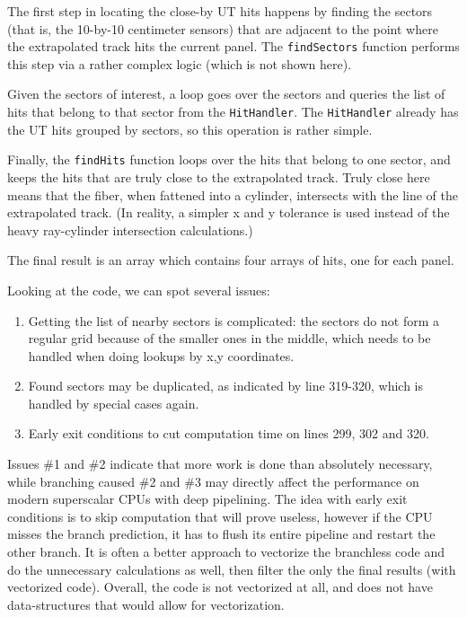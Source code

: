 \documentclass[12pt]{article}
\newcommand{\code}[1]{\texttt{#1}}
\begin{document}
The first step in locating the close-by UT hits happens by finding the sectors (that is, the 10-by-10 centimeter sensors) that are adjacent to the point where the extrapolated track hits the current panel. The \code{findSectors} function performs this step via a rather complex logic (which is not shown here).

Given the sectors of interest, a loop goes over the sectors and queries the list of hits that belong to that sector from the \code{HitHandler}. The \code{HitHandler} already has the UT hits grouped by sectors, so this operation is rather simple.

Finally, the \code{findHits} function loops over the hits that belong to one sector, and keeps the hits that are truly close to the extrapolated track. Truly close here means that the fiber, when fattened into a cylinder, intersects with the line of the extrapolated track. (In reality, a simpler x and y tolerance is used instead of the heavy ray-cylinder intersection calculations.)

The final result is an array which contains four arrays of hits, one for each panel.

\vspace{1pc}

Looking at the code, we can spot several issues:
\begin{enumerate}
	\item Getting the list of nearby sectors is complicated: the sectors do not form a regular grid because of the smaller ones in the middle, which needs to be handled when doing lookups by x,y coordinates.
	\item Found sectors may be duplicated, as indicated by line 319-320, which is handled by special cases again.
	\item Early exit conditions to cut computation time on lines 299, 302 and 320.
\end{enumerate}

Issues \#1 and \#2 indicate that more work is done than absolutely necessary, while branching caused \#2 and \#3 may directly affect the performance on modern superscalar CPUs with deep pipelining. The idea with early exit conditions is to skip computation that will prove useless, however if the CPU misses the branch prediction, it has to flush its entire pipeline and restart the other branch. It is often a better approach to vectorize the branchless code and do the unnecessary calculations as well, then filter the only the final results (with vectorized code). Overall, the code is not vectorized at all, and does not have data-structures that would allow for vectorization.
\end{document}
